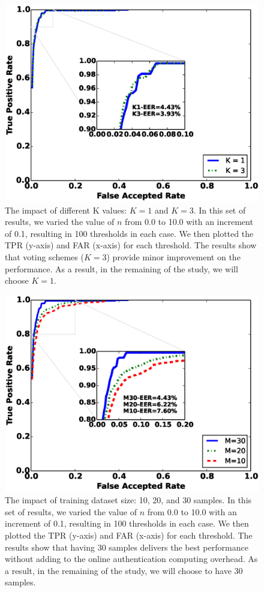 \begin{figure}\centering
\includegraphics[width=.85\columnwidth]{figure/roc_k_value.eps}
\caption{\label{fig:roc_k_value} The impact of different K values: $K=1$ and $K=3$. In this set of results, we varied the value of $n$ from 0.0 to 10.0 with an increment of 0.1, resulting in 100 thresholds in each case. We then plotted the TPR (y-axis) and FAR (x-axis) for each threshold. The results show that voting schemes ($K=3$) provide minor improvement on the performance. As a result, in the remaining of the study, we will choose $K=1$.}
\end{figure}



\begin{figure}[t]
\centering
\includegraphics [width=.85\columnwidth]{figure/roc_diff_size.eps}
\caption{The impact of training dataset size: 10, 20, and 30 samples. In this set of results, we varied the value of $n$ from 0.0 to 10.0 with an increment of 0.1, resulting in 100 thresholds in each case. We then plotted the TPR (y-axis) and FAR (x-axis) for each threshold. The results show that having 30 samples delivers the best performance without adding to the online authentication computing overhead.  As a result, in the remaining of the study, we will choose to have 30 samples.}
\label{fig:roc_diff_size}
\end{figure}

